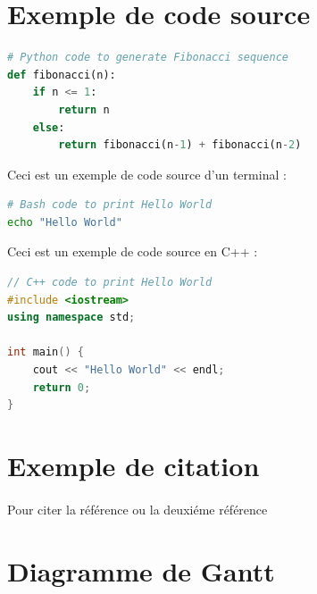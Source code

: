 \section{Exemple de code source}
\begin{lstlisting}[language=Python, caption = Exemple de code source en Python, label=lst:python]
# Python code to generate Fibonacci sequence
def fibonacci(n):
    if n <= 1:
        return n
    else:
        return fibonacci(n-1) + fibonacci(n-2)
\end{lstlisting}

Ceci est un exemple de code source d'un terminal :
\begin{lstlisting}[language=bash, caption = Exemple de code source en bash, label=lst:bash]
# Bash code to print Hello World
echo "Hello World"
\end{lstlisting}

Ceci est un exemple de code source en C++ :
\begin{lstlisting}[language=C++, caption = Exemple de code source en C++, label=lst:cpp]
// C++ code to print Hello World
#include <iostream>
using namespace std;

int main() {
    cout << "Hello World" << endl;
    return 0;
}

\end{lstlisting}


\section{Exemple de citation}
\paragraph{}
Pour citer la référence \cite{ref1} ou la deuxiéme référence \cite{ref2}


\newpage

\section{Diagramme de Gantt}

